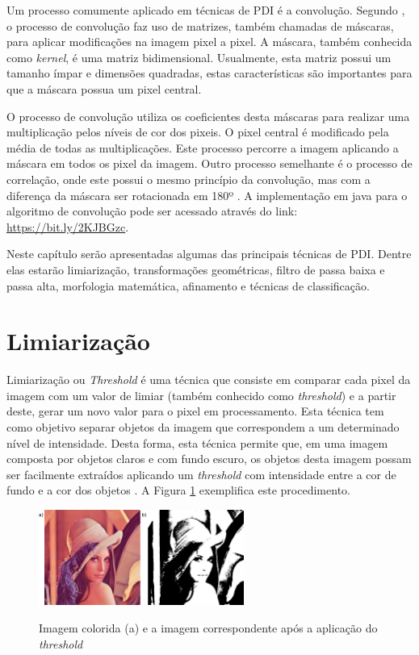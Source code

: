 \documentclass[
	12pt,				%
	oneside,			%
	a4paper,			%
	english,			%
	french,				%
	spanish,			%
	brazil,				%
	]{abntex2}
\begin{document}
Um processo comumente aplicado em técnicas de PDI é a convolução. Segundo \citet{pedriniSchwartz:2008}, o processo de convolução faz uso de matrizes, também chamadas de máscaras, para aplicar modificações na imagem pixel a pixel. A máscara, também conhecida como \textit{kernel}, é uma matriz bidimensional. Usualmente, esta matriz possui um tamanho ímpar e dimensões quadradas, estas características são importantes para que a máscara possua um pixel central.

O processo de convolução utiliza os coeficientes desta máscaras para realizar uma multiplicação pelos níveis de cor dos pixeis. O pixel central é modificado pela média de todas as multiplicações. Este processo percorre a imagem aplicando a máscara em todos os pixel da imagem. Outro processo semelhante é o processo de correlação, onde este possui o mesmo princípio da convolução, mas com a diferença da máscara ser rotacionada em 180º \cite{gonzalesWoods:2008}. A implementação em java para o algoritmo de convolução pode ser acessado através do link: \url{https://bit.ly/2KJBGzc}.

Neste capítulo serão apresentadas algumas das principais técnicas de PDI. Dentre elas estarão limiarização, transformações geométricas, filtro de passa baixa e passa alta, morfologia matemática, afinamento e técnicas de classificação.
\section{Limiarização}
\label{sec:limiarizacao}

Limiarização ou \textit{Threshold} é uma técnica que consiste em comparar cada pixel da imagem com um valor de limiar (também conhecido como \textit{threshold}) e a partir deste, gerar um novo valor para o pixel em processamento. Esta técnica tem como objetivo separar objetos da imagem que correspondem a um determinado nível de intensidade. Desta forma, esta técnica permite que, em uma imagem composta por objetos claros e com fundo escuro, os objetos desta imagem possam ser facilmente extraídos aplicando um \textit{threshold} com intensidade entre a cor de fundo e a cor dos objetos \cite{gonzalesWoods:2008}. A Figura \ref{fig:limiarizacaofig} exemplifica este procedimento.

\begin{figure}[ht]
\centering

\caption{Imagem colorida (a) e a imagem correspondente após a aplicação do \textit{threshold}}
\includegraphics[width=0.6\textwidth]{imagens/limiarizacao.png}
\sourceAuthor
\label{fig:limiarizacaofig}
\end{figure}
\end{document}
